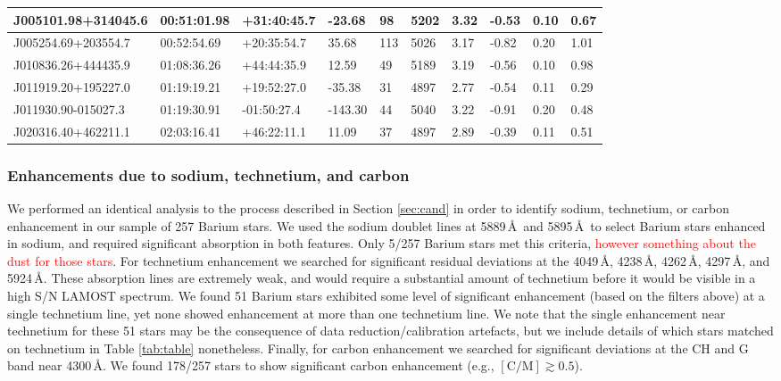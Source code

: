 \documentclass[a4paper,fleqn,usenatbib]{mnras}
\newcommand{\todo}[1]{\textcolor{red}{#1}}
\begin{document}
\begin{table}
\begin{tabular}{@{}|l|l|l|l|l|l|l|l|l|l|@{}}
J005101.98+314045.6 & 00:51:01.98 & +31:40:45.7 & -23.68    & 98  & 5202 & 3.32  & -0.53      & 0.10      & 0.67 \\ \midrule
J005254.69+203554.7 & 00:52:54.69 & +20:35:54.7 & 35.68     & 113 & 5026 & 3.17  & -0.82      & 0.20      & 1.01 \\ \midrule
J010836.26+444435.9 & 01:08:36.26 & +44:44:35.9 & 12.59     & 49  & 5189 & 3.19  & -0.56      & 0.10      & 0.98 \\ \midrule
J011919.20+195227.0 & 01:19:19.21 & +19:52:27.0 & -35.38    & 31  & 4897 & 2.77  & -0.54      & 0.11      & 0.29 \\ \midrule
J011930.90-015027.3 & 01:19:30.91 & -01:50:27.4 & -143.30   & 44  & 5040 & 3.22  & -0.91      & 0.20      & 0.48 \\ \midrule
J020316.40+462211.1 & 02:03:16.41 & +46:22:11.1 & 11.09     & 37  & 4897 & 2.89  & -0.39      & 0.11      & 0.51 \\ \bottomrule
\end{tabular}
\end{table}


\subsubsection{Enhancements due to sodium, technetium, and carbon}
We performed an identical analysis to the process described in Section \ref{sec:cand} in order to identify sodium, technetium, or carbon enhancement in our sample of 257 Barium stars. We used the sodium doublet lines at 5889\,\AA\ and 5895\,\AA\ to select Barium stars enhanced in sodium, and required significant absorption in both features. Only 5/257 Barium stars met this criteria,  \todo{however something about the dust for those stars}. For technetium enhancement we searched for significant residual deviations at the 4049\,\AA, 4238\,\AA, 4262\,\AA, 4297\,\AA, and 5924\,\AA. These absorption lines are extremely weak, and would require a substantial amount of technetium before it would be visible in a high S/N LAMOST spectrum. We found 51 Barium stars exhibited some level of significant enhancement (based on the filters above) at a single technetium line, yet none showed enhancement at more than one technetium line. We note that the single enhancement near technetium for these 51 stars may be the consequence of data reduction/calibration artefacts, but we include details of which stars matched on technetium in Table \ref{tab:table} nonetheless.
Finally, for carbon enhancement we searched for significant deviations at the CH and G band near 4300\,\AA. We found 178/257 stars to show significant carbon enhancement (e.g., $[\textrm{C/M}] \gtrsim 0.5$).
\end{document}
